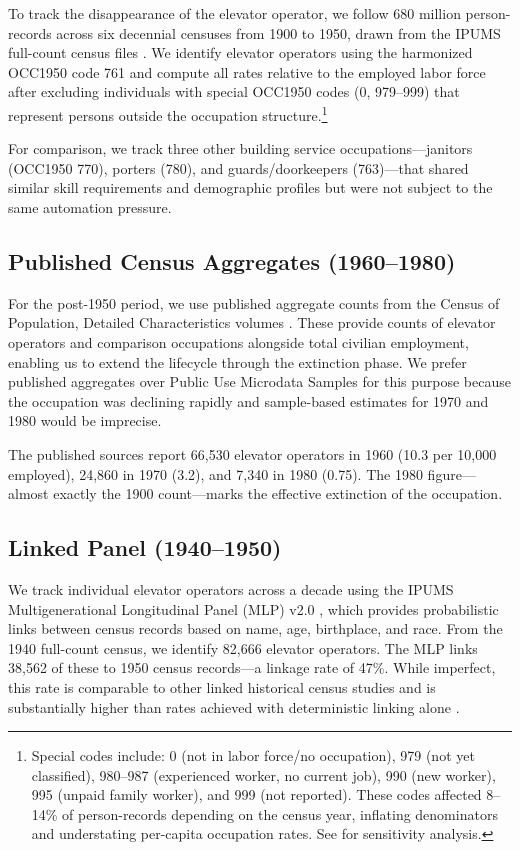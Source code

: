 \documentclass[12pt]{article}
\begin{document}
To track the disappearance of the elevator operator, we follow 680 million person-records across six decennial censuses from 1900 to 1950, drawn from the IPUMS full-count census files \citep{ruggles2024}. We identify elevator operators using the harmonized OCC1950 code 761 and compute all rates relative to the employed labor force after excluding individuals with special OCC1950 codes (0, 979--999) that represent persons outside the occupation structure.\footnote{Special codes include: 0 (not in labor force/no occupation), 979 (not yet classified), 980--987 (experienced worker, no current job), 990 (new worker), 995 (unpaid family worker), and 999 (not reported). These codes affected 8--14\% of person-records depending on the census year, inflating denominators and understating per-capita occupation rates. See  for sensitivity analysis.}

For comparison, we track three other building service occupations---janitors (OCC1950 770), porters (780), and guards/doorkeepers (763)---that shared similar skill requirements and demographic profiles but were not subject to the same automation pressure.

\subsection{Published Census Aggregates (1960--1980)}

For the post-1950 period, we use published aggregate counts from the Census of Population, Detailed Characteristics volumes \citep{census1960}. These provide counts of elevator operators and comparison occupations alongside total civilian employment, enabling us to extend the lifecycle through the extinction phase. We prefer published aggregates over Public Use Microdata Samples for this purpose because the occupation was declining rapidly and sample-based estimates for 1970 and 1980 would be imprecise.

The published sources report 66,530 elevator operators in 1960 (10.3 per 10,000 employed), 24,860 in 1970 (3.2), and 7,340 in 1980 (0.75). The 1980 figure---almost exactly the 1900 count---marks the effective extinction of the occupation.

\subsection{Linked Panel (1940--1950)}

We track individual elevator operators across a decade using the IPUMS Multigenerational Longitudinal Panel (MLP) v2.0 \citep{ruggles2021}, which provides probabilistic links between census records based on name, age, birthplace, and race. From the 1940 full-count census, we identify 82,666 elevator operators. The MLP links 38,562 of these to 1950 census records---a linkage rate of 47\%. While imperfect, this rate is comparable to other linked historical census studies and is substantially higher than rates achieved with deterministic linking alone \citep{abramitzky2021, bailey2020}.
\end{document}
